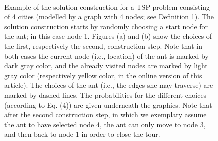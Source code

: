 \begin{figure}[h]
  \\
  \label{img:exemp_aco}
  \caption{Example of the solution construction for a TSP problem consisting
  of 4 cities (modelled by a graph with 4 nodes; see Definition 1). The
  solution construction starts by randomly choosing a start node for the ant;
  in this case node 1. Figures (a) and (b) show the choices of the first,
  respectively the second, construction step. Note that in both cases the
  current node (i.e., location) of the ant is marked by dark gray color, and
  the already visited nodes are marked by light gray color (respectively
  yellow color, in the online version of this article). The choices of the ant
  (i.e., the edges she may traverse) are marked by dashed lines. The probabilities
  for the different choices (according to Eq. (4)) are given underneath the
  graphics. Note that after the second construction step, in which we exemplary
  assume the ant to have selected node 4, the ant can only move to node 3, and
  then back to node 1 in order to close the tour. \cite{blum2005aco}}
\end{figure}


